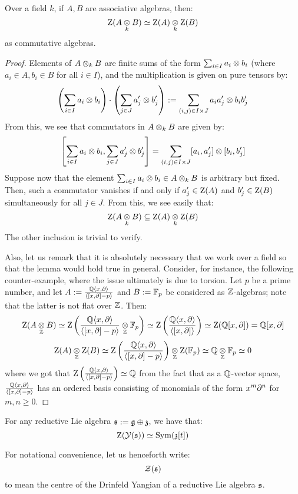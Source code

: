         \begin{lemma} \label{lemma: centres_of_tensor_products_of_algebras}
            Over a field $k$, if $A, B$ are associative algebras, then:
                $$\rmZ(A \tensor_k B) \cong \rmZ(A) \tensor_k \rmZ(B)$$
            as commutative algebras.
        \end{lemma}
            \begin{proof}
                Elements of $A \tensor_k B$ are finite sums of the form $\sum_{i \in I} a_i \tensor b_i$ (where $a_i \in A, b_i \in B$ for all $i \in I$), and the multiplication is given on pure tensors by:
                    $$\left( \sum_{i \in I} a_i \tensor b_i \right) \cdot \left( \sum_{j \in J} a'_j \tensor b'_j \right) := \sum_{(i, j) \in I \x J} a_i a'_j \tensor b_i b'_j$$
                From this, we see that commutators in $A \tensor_k B$ are given by:
                    $$\left[ \sum_{i \in I} a_i \tensor b_i, \sum_{j \in J} a'_j \tensor b'_j \right] = \sum_{(i, j) \in I \x J} [a_i, a'_j] \tensor [b_i, b'_j]$$
                Suppose now that the element $\sum_{i \in I} a_i \tensor b_i \in A \tensor_k B$ is arbitrary but fixed. Then, such a commutator vanishes if and only if $a'_j \in \mathrm{Z}(A)$ and $b'_j \in \mathrm{Z}(B)$ simultaneously for all $j \in J$. From this, we see easily that:
                    $$\rmZ(A \tensor_k B) \subseteq \rmZ(A) \tensor_k \rmZ(B)$$
                The other inclusion is trivial to verify.

                Also, let us remark that it is absolutely necessary that we work over a field so that the lemma would hold true in general. Consider, for instance, the following counter-example, where the issue ultimately is due to torsion. Let $p$ be a prime number, and let $A := \frac{\mathbb{Q}\langle x, \partial\rangle}{\langle[x, \partial] - p\rangle}$ and $B := \mathbb{F}_p$ be considered as $\mathbb{Z}$-algebras; note that the latter is not flat over $\mathbb{Z}$. Then:
                    $$\rmZ(A \tensor_{\Z} B) \cong \rmZ\left( \frac{\Q\<x, \del\>}{\<[x, \del] - p\>} \tensor_{\Z} \F_p \right) \cong \rmZ\left( \frac{\Q\<x, \del\>}{\<[x, \del]\>} \right) \cong \rmZ(\Q[x, \del]) = \Q[x, \del]$$
                    $$\rmZ(A) \tensor_{\Z} \rmZ(B) \cong \rmZ\left( \frac{\Q\<x, \del\>}{\<[x, \del] - p\>} \right) \tensor_{\Z} \rmZ(\F_p) \cong \Q \tensor_{\Z} \F_p \cong 0$$
                where we got that $\mathrm{Z}\left( \frac{\mathbb{Q}\langle x, \partial\rangle}{\langle[x, \partial] - p\rangle} \right) \simeq \mathbb{Q}$ from the fact that as a $\mathbb{Q}$-vector space, $\frac{\mathbb{Q}\langle x, \partial\rangle}{\langle[x, \partial] - p\rangle}$ has an ordered basis consisting of monomials of the form $x^m \partial^n$ for $m, n \geq 0$.
            \end{proof}
        \begin{corollary}
            For any reductive Lie algebra $\mathfrak{s} := \mathfrak{g} \oplus \mathfrak{z}$, we have that:
                $$\mathrm{Z}( \mathcal{Y}(\mathfrak{s}) ) \simeq \mathrm{Sym}(\mathfrak{z}[t])$$
        \end{corollary}
        \begin{convention}
            For notational convenience, let us henceforth write:
                $$\mathcal{Z}(\mathfrak{s})$$
            to mean the centre of the Drinfeld Yangian of a reductive Lie algebra $\mathfrak{s}$.
        \end{convention}
            
